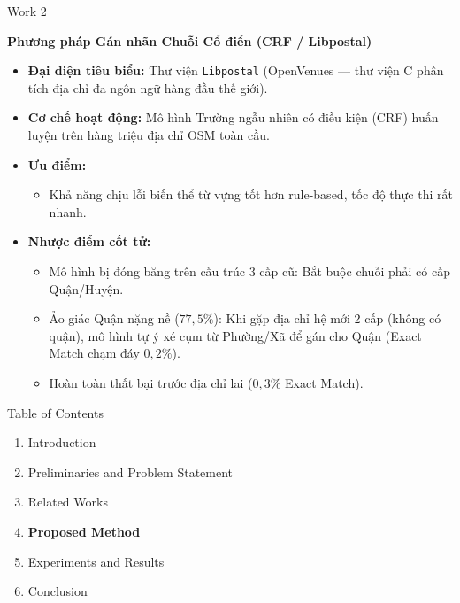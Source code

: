 \documentclass[aspectratio=169,9pt]{beamer}
\begin{document}
\begin{frame}{Work 2}
  \vspace{0.05cm}
  \centerline{\large\textbf{Phương pháp Gán nhãn Chuỗi Cổ điển (CRF / Libpostal)}}
  \vspace{0.2cm}

  \begin{itemize}
    \setlength{\itemsep}{4pt}
    \item \textbf{Đại diện tiêu biểu:} Thư viện \texttt{Libpostal} (OpenVenues — thư viện C phân tích địa chỉ đa ngôn ngữ hàng đầu thế giới).
    \item \textbf{Cơ chế hoạt động:} Mô hình Trường ngẫu nhiên có điều kiện (CRF) huấn luyện trên hàng triệu địa chỉ OSM toàn cầu.
    \item \textbf{Ưu điểm:}
      \begin{itemize}
        \setlength{\itemsep}{2pt}
        \item Khả năng chịu lỗi biến thể từ vựng tốt hơn rule-based, tốc độ thực thi rất nhanh.
      \end{itemize}
    \item \textbf{Nhược điểm cốt tử:}
      \begin{itemize}
        \setlength{\itemsep}{2pt}
        \item Mô hình bị đóng băng trên cấu trúc 3 cấp cũ: Bắt buộc chuỗi phải có cấp Quận/Huyện.
        \item Ảo giác Quận nặng nề ($77{,}5\%$): Khi gặp địa chỉ hệ mới 2 cấp (không có quận), mô hình tự ý xé cụm từ Phường/Xã để gán cho Quận (Exact Match chạm đáy $0{,}2\%$).
        \item Hoàn toàn thất bại trước địa chỉ lai ($0{,}3\%$ Exact Match).
      \end{itemize}
  \end{itemize}
\end{frame}

\begin{frame}{Table of Contents}
  \vspace{0.4cm}
  \begin{enumerate}[\bfseries 1]
    \setlength{\itemsep}{0.35cm}
    \item \color{gray} Introduction
    \item \color{gray} Preliminaries and Problem Statement
    \item \color{gray} Related Works
    \item \textbf{\color{bkblue} Proposed Method}
    \item \color{gray} Experiments and Results
    \item \color{gray} Conclusion
  \end{enumerate}
\end{frame}
\end{document}
